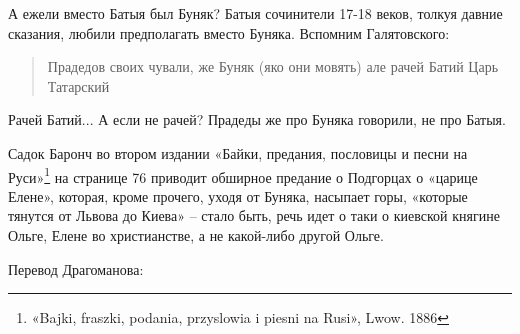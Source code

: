 А ежели вместо Батыя был Буняк? Батыя сочинители 17-18 веков, толкуя давние сказания, любили предполагать вместо Буняка. Вспомним Галятовского:

\begin{quotation}
Прадедов своих чували, же Буняк (яко они мовять) але рачей Батий Царь Татарский
\end{quotation}

Рачей Батий... А если не рачей? Прадеды же про Буняка говорили, не про Батыя.



Садок Баронч во втором издании «Байки, предания, пословицы и песни на Руси»\footnote{«Bajki, fraszki, podania, przyslowia i piesni na Rusi», Lwow. 1886} на странице 76 приводит обширное предание о Подгорцах о «царице Елене», которая, кроме прочего, уходя от Буняка, насыпает горы, «которые тянутся от Львова до Киева» – стало быть, речь идет о таки о киевской княгине Ольге, Елене во христианстве, а не какой-либо другой Ольге.
 
Перевод Драгоманова:

